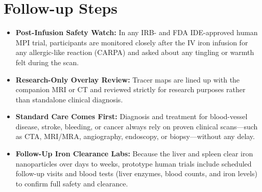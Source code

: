 \section{Follow-up Steps}
\begin{itemize}
  \item \textbf{Post-Infusion Safety Watch:} In any IRB- and FDA IDE-approved human MPI trial, participants are monitored closely after the IV iron infusion for any allergic-like reaction (CARPA) and asked about any tingling or warmth felt during the scan.
  \item \textbf{Research-Only Overlay Review:} Tracer maps are lined up with the companion MRI or CT and reviewed strictly for research purposes rather than standalone clinical diagnosis.
  \item \textbf{Standard Care Comes First:} Diagnosis and treatment for blood-vessel disease, stroke, bleeding, or cancer always rely on proven clinical scans---such as CTA, MRI/MRA, angiography, endoscopy, or biopsy---without any delay.
  \item \textbf{Follow-Up Iron Clearance Labs:} Because the liver and spleen clear iron nanoparticles over days to weeks, prototype human trials include scheduled follow-up visits and blood tests (liver enzymes, blood counts, and iron levels) to confirm full safety and clearance.
\end{itemize}

